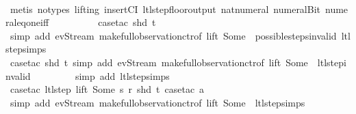 \begin{isabellebody}
\ \ \ \ \ \ \ \ \ \isamarkupfalse%
\ {\isacharparenleft}metis\ {\isacharparenleft}no{\isacharunderscore}types{\isacharcomma}\ lifting{\isacharparenright}\ insertCI\ ltl{\isacharunderscore}step{\isacharunderscore}floor{\isacharunderscore}output\ nat{\isacharunderscore}numeral\ numeral{\isacharunderscore}Bit{}\ numeral{\isacharunderscore}eq{\isacharunderscore}one{\isacharunderscore}iff{\isacharparenright}\isanewline
\isanewline
\ \ \ \ \ \ \ \ \isamarkupfalse%
\ {\isacharparenleft}case{\isacharunderscore}tac\ {\isachardoublequoteopen}shd\ t{\isachardoublequoteclose}{\isacharparenright}\isanewline
\ \ \ \ \ \ \ \ \isamarkupfalse%
\ {\isacharparenleft}simp\ add{\isacharcolon}\ ev{\isacharunderscore}Stream\ make{\isacharunderscore}full{\isacharunderscore}observation{\isachardot}ctr{\isacharbrackleft}of\ lift\ {\isachardoublequoteopen}Some\ {}{\isachardoublequoteclose}{\isacharbrackright}\ possible{\isacharunderscore}steps{\isacharunderscore}{}{\isacharunderscore}invalid\ ltl{\isacharunderscore}step{\isachardot}simps{\isacharparenright}\isanewline
\isanewline
\ \ \ \ \ \ \ \isamarkupfalse%
\ {\isacharparenleft}case{\isacharunderscore}tac\ {\isachardoublequoteopen}shd\ t{\isachardoublequoteclose}{\isacharcomma}\ simp\ add{\isacharcolon}\ ev{\isacharunderscore}Stream\ make{\isacharunderscore}full{\isacharunderscore}observation{\isachardot}ctr{\isacharbrackleft}of\ lift\ {\isachardoublequoteopen}Some\ {}{\isachardoublequoteclose}{\isacharbrackright}\ ltl{\isacharunderscore}step{\isacharunderscore}{}{\isacharunderscore}invalid{\isacharparenright}\isanewline
\ \ \ \ \ \ \ \isamarkupfalse%
\ {\isacharparenleft}simp\ add{\isacharcolon}\ ltl{\isacharunderscore}step{\isachardot}simps{\isacharparenleft}{}{\isacharparenright}{\isacharparenright}\isanewline
\isanewline
\ \ \ \ \ \ \isamarkupfalse%
\ {\isacharparenleft}case{\isacharunderscore}tac\ {\isachardoublequoteopen}ltl{\isacharunderscore}step\ lift\ {\isacharparenleft}Some\ s{\isacharparenright}\ r\ {\isacharparenleft}shd\ t{\isacharparenright}{\isachardoublequoteclose}{\isacharcomma}\ case{\isacharunderscore}tac\ a{\isacharparenright}\isanewline
\ \ \ \ \ \ \ \isamarkupfalse%
\ {\isacharparenleft}simp\ add{\isacharcolon}\ ev{\isacharunderscore}Stream\ make{\isacharunderscore}full{\isacharunderscore}observation{\isachardot}ctr{\isacharbrackleft}of\ lift\ {\isachardoublequoteopen}Some\ {}{\isachardoublequoteclose}{\isacharbrackright}\ ltl{\isacharunderscore}step{\isachardot}simps{\isacharparenright}\isanewline

\end{isabellebody}
